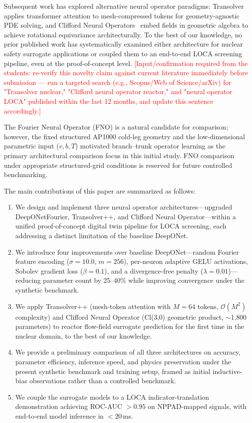 \documentclass[journal]{IEEEtran}
\begin{document}
Subsequent work has explored alternative neural operator paradigms: Transolver~\cite{wu2024transolver} applies transformer attention to mesh-compressed tokens for geometry-agnostic PDE solving, and Clifford Neural Operators~\cite{brandstetter2023clifford} embed fields in geometric algebra to achieve rotational equivariance architecturally. To the best of our knowledge, no prior published work has systematically examined either architecture for nuclear safety surrogate applications or coupled them to an end-to-end LOCA screening pipeline, even at the proof-of-concept level. \textcolor{red}{[Input/confirmation required from the students: re-verify this novelty claim against current literature immediately before submission --- run a targeted search (e.g., Scopus/Web of Science/arXiv) for "Transolver nuclear," "Clifford neural operator reactor," and "neural operator LOCA" published within the last 12 months, and update this sentence accordingly.]}

The Fourier Neural Operator (FNO) \cite{li2021fno} is a natural candidate for comparison; however, the fixed structured AP1000 cold-leg geometry and the low-dimensional parametric input ($v, b, T$) motivated branch--trunk operator learning as the primary architectural comparison focus in this initial study. FNO comparison under appropriate structured-grid conditions is reserved for future controlled benchmarking.

The main contributions of this paper are summarized as follows:
\begin{enumerate}
    \item We design and implement three neural operator architectures---upgraded DeepONetFourier, Transolver++, and Clifford Neural Operator---within a unified proof-of-concept digital twin pipeline for LOCA screening, each addressing a distinct limitation of the baseline DeepONet.
    \item We introduce four improvements over baseline DeepONet---random Fourier feature encoding ($\sigma = 10.0$, $m = 256$), per-neuron adaptive GELU activations, Sobolev gradient loss ($\beta = 0.1$), and a divergence-free penalty ($\lambda = 0.01$)---reducing parameter count by 25--40\% while improving convergence under the synthetic benchmark.
    \item We apply Transolver++ (mesh-token attention with $M = 64$ tokens, $\mathcal{O}(M^2)$ complexity) and Clifford Neural Operator (Cl(3,0) geometric product, $\sim$1,800 parameters) to reactor flow-field surrogate prediction for the first time in the nuclear domain, to the best of our knowledge.
    \item We provide a preliminary comparison of all three architectures on accuracy, parameter efficiency, inference speed, and physics preservation under the present synthetic benchmark and training setup, framed as initial inductive-bias observations rather than a controlled benchmark.
    \item We couple the surrogate models to a LOCA indicator-translation demonstration achieving ROC-AUC $> 0.95$ on NPPAD-mapped signals, with end-to-end model inference in $< 20$\,ms.
\end{enumerate}
\end{document}
